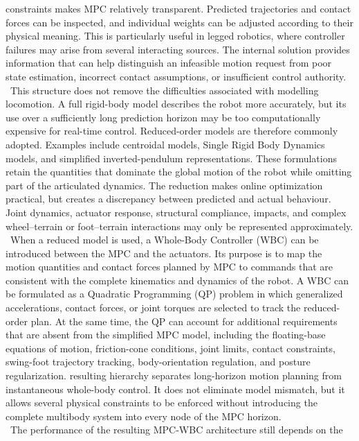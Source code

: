 constraints makes MPC relatively transparent. Predicted trajectories and
contact forces can be inspected, and individual weights can be adjusted
according to their physical meaning. This is particularly useful in legged
robotics, where controller failures may arise from several interacting sources.
The internal solution provides information that can help distinguish an
infeasible motion request from poor state estimation, incorrect contact
assumptions, or insufficient control authority.\\
\
This structure does not remove the difficulties associated with modelling
locomotion. A full rigid-body model describes the robot more accurately, but
its use over a sufficiently long prediction horizon may be too computationally
expensive for real-time control. Reduced-order models are therefore commonly
adopted. Examples include centroidal models, Single Rigid Body Dynamics models,
and simplified inverted-pendulum representations. These formulations retain
the quantities that dominate the global motion of the robot while omitting part
of the articulated dynamics. The reduction makes online optimization
practical, but creates a discrepancy between predicted and actual behaviour.
Joint dynamics, actuator response, structural compliance, impacts, and complex
wheel--terrain or foot--terrain interactions may only be represented
approximately.\\
\
When a reduced model is used, a Whole-Body Controller (WBC) can be introduced between
the MPC and the actuators. Its purpose is to map the motion quantities and
contact forces planned by MPC to commands that are consistent with the complete
kinematics and dynamics of the robot. A WBC can be formulated as a Quadratic
Programming (QP) problem in which generalized accelerations, contact forces, or joint torques
are selected to track the reduced-order plan. At the same time, the QP can
account for additional requirements that are absent from the simplified MPC
model, including the floating-base equations of motion, friction-cone
conditions, joint limits, contact constraints, swing-foot trajectory tracking,
body-orientation regulation, and posture regularization.  resulting
hierarchy separates long-horizon motion planning from instantaneous whole-body
control. It does not eliminate model mismatch, but it allows several physical
constraints to be enforced without introducing the complete multibody system
into every node of the MPC horizon.\\
\
The performance of the resulting MPC-WBC architecture still depends on the
